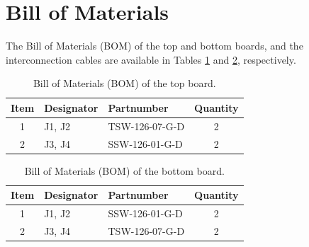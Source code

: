 \section{Bill of Materials}

The Bill of Materials (BOM) of the top and bottom boards, and the interconnection cables are available in Tables \ref{tab:bom-top-board} and \ref{tab:bom-bottom-board}, respectively.

\begin{table}[!h]
    \centering
    \begin{tabular}{cllc}
        \toprule[1.5pt]
        \textbf{Item} & \textbf{Designator} & \textbf{Partnumber} & \textbf{Quantity} \\
        \midrule
        1 & J1, J2 & TSW-126-07-G-D & 2 \\
        2 & J3, J4 & SSW-126-01-G-D & 2 \\
        \bottomrule[1.5pt]
    \end{tabular}
    \caption{Bill of Materials (BOM) of the top board.}
    \label{tab:bom-top-board}
\end{table}

\begin{table}[!h]
    \centering
    \begin{tabular}{cllc}
        \toprule[1.5pt]
        \textbf{Item} & \textbf{Designator} & \textbf{Partnumber} & \textbf{Quantity} \\
        \midrule
        1 & J1, J2 & SSW-126-01-G-D & 2 \\
        2 & J3, J4 & TSW-126-07-G-D & 2 \\
        \bottomrule[1.5pt]
    \end{tabular}
    \caption{Bill of Materials (BOM) of the bottom board.}
    \label{tab:bom-bottom-board}
\end{table}
